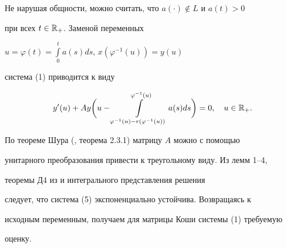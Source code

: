 \begin{pf} 


Не нарушая общности, можно считать, что $a(\cdot)\notin L$ и $a(t)>0$ 


при всех $t\in\Bbb R_+$. Заменой переменных 


$u=\varphi(t)=\int\limits^t_0a(s)d s$, $x(\varphi^{-1}(u))=y(u)$ 


система (1) приводится к виду 


\begin{equation} 


y'(u)+A y\bigg(u-\int\limits^{\varphi^{-1}(u)} 


_{\varphi^{-1}(u)-r(\varphi^{-1}(u))}a(s)d s \bigg)=0,\quad 


u\in\Bbb R_+. 


\end{equation} 


По теореме Шура (\cite{8}, теорема 2.3.1) матрицу $A$ можно с помощью 


унитарного преобразования привести к треугольному виду. Из лемм 1--4, 


теоремы Д4 из \cite{9} и интегрального представления решения \cite{4} 


следует, что система (5) экспоненциально устойчива. Возвращаясь к 


исходным переменным, получаем для матрицы Коши системы (1) требуемую 


оценку. 


\end{pf} 


 


 


